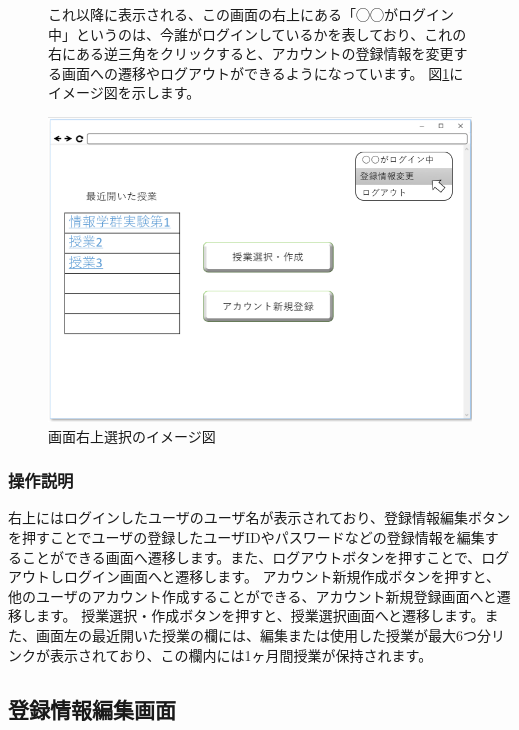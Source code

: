 \begin{figure}[htbp]

  これ以降に表示される、この画面の右上にある「◯◯がログイン中」というのは、今誰がログインしているかを表しており、これの右にある逆三角をクリックすると、アカウントの登録情報を変更する画面への遷移やログアウトができるようになっています。
  図\ref{fig:05}にイメージ図を示します。

  \begin{center}
    \includegraphics[width=1\linewidth,clip]{./img/05.png}
    \caption{画面右上選択のイメージ図}\label{fig:05}
  \end{center}
\end{figure}

\subsubsection{操作説明}
右上にはログインしたユーザのユーザ名が表示されており、登録情報編集ボタンを押すことでユーザの登録したユーザIDやパスワードなどの登録情報を編集することができる画面へ遷移します。また、ログアウトボタンを押すことで、ログアウトしログイン画面へと遷移します。
アカウント新規作成ボタンを押すと、他のユーザのアカウント作成することができる、アカウント新規登録画面へと遷移します。
授業選択・作成ボタンを押すと、授業選択画面へと遷移します。また、画面左の最近開いた授業の欄には、編集または使用した授業が最大6つ分リンクが表示されており、この欄内には1ヶ月間授業が保持されます。

\newpage

\subsection{登録情報編集画面}
